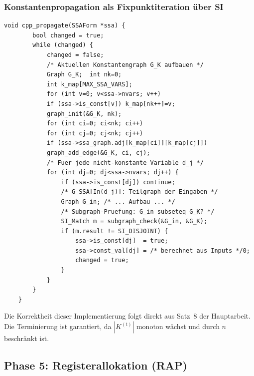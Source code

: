 ﻿\documentclass[a4paper,12pt]{article}
\theoremstyle{definition}
\begin{document}
\subsubsection{Konstantenpropagation als Fixpunktiteration über SI}

\begin{lstlisting}[style=cstyle, caption={CPP -- iterative SI-Prüfung
		(compiler\_full.c)}, label=lst:cpp-impl]
	void cpp_propagate(SSAForm *ssa) {
		bool changed = true;
		while (changed) {
			changed = false;
			/* Aktuellen Konstantengraph G_K aufbauen */
			Graph G_K;  int nk=0;
			int k_map[MAX_SSA_VARS];
			for (int v=0; v<ssa->nvars; v++)
			if (ssa->is_const[v]) k_map[nk++]=v;
			graph_init(&G_K, nk);
			for (int ci=0; ci<nk; ci++)
			for (int cj=0; cj<nk; cj++)
			if (ssa->ssa_graph.adj[k_map[ci]][k_map[cj]])
			graph_add_edge(&G_K, ci, cj);
			/* Fuer jede nicht-konstante Variable d_j */
			for (int dj=0; dj<ssa->nvars; dj++) {
				if (ssa->is_const[dj]) continue;
				/* G_SSA[In(d_j)]: Teilgraph der Eingaben */
				Graph G_in; /* ... Aufbau ... */
				/* Subgraph-Pruefung: G_in subseteq G_K? */
				SI_Match m = subgraph_check(&G_in, &G_K);
				if (m.result != SI_DISJOINT) {
					ssa->is_const[dj]  = true;
					ssa->const_val[dj] = /* berechnet aus Inputs */0;
					changed = true;
				}
			}
		}
	}
\end{lstlisting}

Die Korrektheit dieser Implementierung folgt direkt aus Satz~8 der
Hauptarbeit. Die Terminierung ist garantiert, da $|K^{(t)}|$ monoton wächst
und durch $n$ beschränkt ist.

\subsection{Phase 5: Registerallokation (RAP)}
\label{sec:impl-rap}
\end{document}
